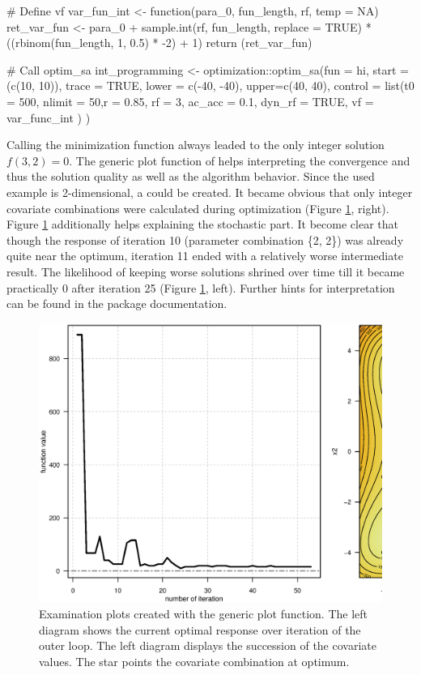 \begin{example}
# Define vf
var_fun_int <- function(para_0, fun_length, rf, temp = NA){
	ret_var_fun <- para_0 + sample.int(rf, fun_length, replace = TRUE) *
	((rbinom(fun_length, 1, 0.5) * -2) + 1)
	return (ret_var_fun)
}

# Call optim_sa
int_programming <- optimization::optim_sa(fun = hi, start = (c(10, 10)), trace = TRUE, 
	lower = c(-40, -40), upper=c(40, 40),
	control = list(t0 = 500, nlimit = 50,r = 0.85, rf = 3, ac_acc = 0.1,
		dyn_rf = TRUE, vf = var_func_int
		)
	)
\end{example}

Calling the minimization function always leaded to the only integer solution $f(3, 2)=0$. The generic plot function of  helps interpreting the convergence and thus the solution quality as well as the algorithm behavior. Since the used example is 2-dimensional, a  could be created. It became obvious that only integer covariate combinations were calculated during optimization (Figure \ref{fig:fig2}, right). Figure \ref{fig:fig2} additionally helps explaining the stochastic part. It become clear that though the response of iteration 10 (parameter combination \{2, 2\}) was already quite near the optimum, iteration 11 ended with a relatively worse intermediate result. The likelihood of keeping worse solutions shrined over time till it became practically 0 after iteration 25 (Figure \ref{fig:fig2}, left). Further hints for interpretation can be found in the package documentation.

\begin{figure}[htbp]
	\centering
	\includegraphics[width=1.01\textwidth]{Fig/fig2-ex2-plot.eps}
	\caption{Examination plots created with the generic plot function. The left diagram shows the current optimal response over iteration of the outer loop. The left diagram displays the succession of the covariate values. The star points the covariate combination at optimum.}
	\label{fig:fig2}
\end{figure}

